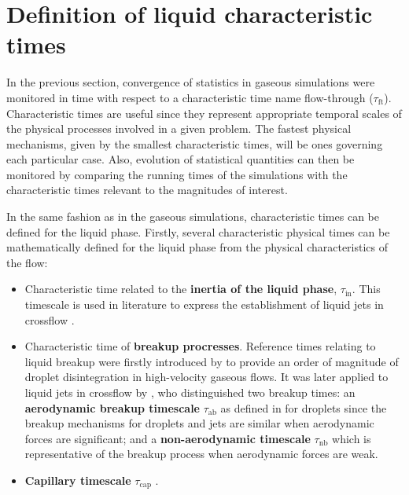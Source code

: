 \section{Definition of liquid characteristic times}
\label{sec:ch5_liquid_characteristic_times}

In the previous section, convergence of statistics in gaseous simulations were monitored in time with respect to a characteristic time name flow-through ($\tau_\mathrm{ft}$). Characteristic times are useful since they represent appropriate temporal scales of the physical processes involved in a given problem. The fastest physical mechanisms, given by the smallest characteristic times, will be ones governing each particular case. Also, evolution of statistical quantities can then be monitored by comparing the running times of the simulations with the characteristic times relevant to the magnitudes of interest. 

In the same fashion as in the gaseous simulations, characteristic times can be defined for the liquid phase. Firstly, several characteristic physical times can be mathematically defined for the liquid phase from the physical characteristics of the flow:

\begin{itemize}

	\item Characteristic time related to the \textbf{ inertia of the liquid phase}, $\tau_\mathrm{in}$. This timescale is used in literature to express the establishment of liquid jets in crossflow .

	\item Characteristic time of \textbf{breakup procresses}. Reference times relating to liquid breakup were firstly introduced by  to provide an order of magnitude of droplet disintegration in high-velocity gaseous flows. It was later applied to liquid jets in crossflow by , who distinguished two breakup times: an \textbf{aerodynamic breakup timescale} $\tau_\mathrm{ab}$ as defined in  for droplets since the breakup mechanisms for droplets and jets are similar when aerodynamic forces are significant; and a \textbf{non-aerodynamic timescale} $\tau_\mathrm{nb}$ which is representative of the breakup process when aerodynamic forces are weak.
	
	\item \textbf{Capillary timescale} $\tau_\mathrm{cap}$ .
	
	


\end{itemize}

